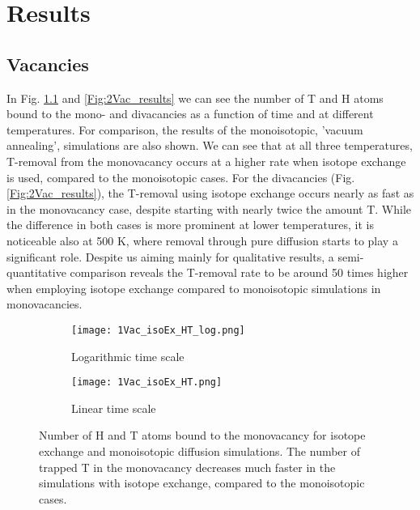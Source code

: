 \chapter{Results}

\section{Vacancies}
In Fig. \ref{Fig:1Vac_results} and \ref{Fig:2Vac_results} we can see the number of T and H atoms bound to the mono- and divacancies as a function of time and at different temperatures. 
For comparison, the results of the monoisotopic, 'vacuum annealing', simulations are also shown. 
We can see that at all three temperatures, T-removal from the monovacancy occurs at a higher rate when isotope exchange is used, compared to the monoisotopic cases.
For the divacancies (Fig. \ref{Fig:2Vac_results}), the T-removal using isotope exchange occurs nearly as fast as in the monovacancy case, despite starting with nearly twice the amount T. 
While the difference in both cases is more prominent at lower temperatures, it is noticeable also at 500 K, where removal through pure diffusion starts to play a significant role.
Despite us aiming mainly for qualitative results, a semi-quantitative comparison reveals the T-removal rate to be around 50 times higher when employing isotope exchange compared to monoisotopic simulations in monovacancies. 

\begin{figure}[!ht]
\begin{subfigure}{.5\textwidth}
  \centering
  \texttt{[image: 1Vac\_isoEx\_HT\_log.png]}  
  \caption{Logarithmic time scale}
\end{subfigure}
\begin{subfigure}{.5\textwidth}
  \centering
  \texttt{[image: 1Vac\_isoEx\_HT.png]}  
  \caption{Linear time scale}
\end{subfigure}
\caption{Number of H and T atoms bound to the monovacancy for isotope exchange and monoisotopic diffusion simulations. The number of trapped T in the monovacancy decreases much faster in the simulations with isotope exchange, compared to the monoisotopic cases.}
 \label{Fig:1Vac_results} 
\end{figure}


